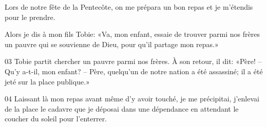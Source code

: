 Lors de notre fête de la Pentecôte, on me prépara un bon repas et je m’étendis pour le prendre.

Alors je dis à mon fils Tobie: «Va, mon enfant, essaie de trouver parmi nos frères un pauvre qui se souvienne de Dieu, pour qu’il partage mon repas.»

03 Tobie partit chercher un pauvre parmi nos frères. À son retour, il dit: «Père! – Qu’y a-t-il, mon enfant? – Père, quelqu’un de notre nation a été assassiné; il a été jeté sur la place publique.»

04 Laissant là mon repas avant même d’y avoir touché, je me précipitai, j’enlevai de la place le cadavre que je déposai dans une dépendance en attendant le coucher du soleil pour l’enterrer.
